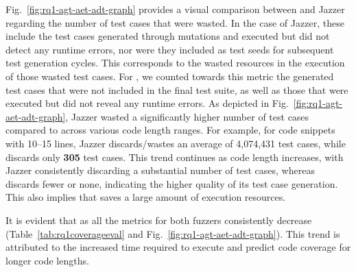 Fig.~\ref{fig:rq1-agt-aet-adt-graph} provides a visual comparison
between {\tool} and Jazzer regarding the number of test cases that
were wasted. In the case of Jazzer, these include the test cases
generated through mutations and executed but did not detect any
runtime errors, nor were they included as test seeds for subsequent
test generation cycles. This corresponds to the wasted resources in
the execution of those wasted test cases.  For {\tool}, we counted
towards this metric the generated test cases that were not included in
the final test suite, as well as those that were executed but did not
reveal any runtime errors. As depicted in
Fig.~\ref{fig:rq1-agt-aet-adt-graph}, Jazzer wasted a significantly
higher number of test cases compared to {\tool} across various code
length ranges. For example, for code snippets with 10--15 lines,
Jazzer discards/wastes an average of 4,074,431 test cases, while
{\tool} discards only {\bf 305} test cases. This trend
continues as code length increases, with Jazzer consistently
discarding a substantial number of test cases, whereas {\tool}
discards fewer or none, indicating the higher quality of its test case
generation. This also implies that {\tool} saves a large amount of
execution resources.

It is evident that as all the metrics for both fuzzers consistently decrease (Table~\ref{tab:rq1coverageeval} and Fig.~\ref{fig:rq1-agt-aet-adt-graph}). This trend is attributed to the increased time required to execute and predict code coverage for longer code lengths.




